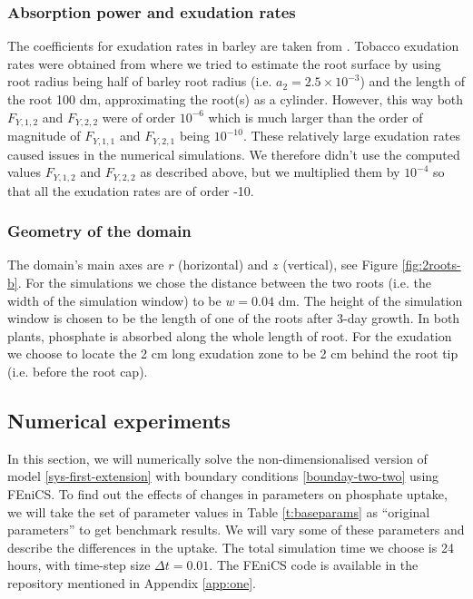 \documentclass[11pt]{article}
\numberwithin{equation}{section}
\begin{document}
\subsubsection{Absorption power and exudation rates}
The coefficients for exudation rates in barley are taken from \cite{Ruiz-2020}. Tobacco exudation rates were obtained from \cite{giles_george} where we tried to estimate the root surface by using root radius being half of barley root radius (i.e. $a_2 = 2.5 \times 10^{-3}$) and the length of the root 100 \si{dm}, approximating the root(s) as a cylinder. However, this way both $F_{Y,1,2}$ and $F_{Y,2,2}$ were of order $10^{-6}$ which is much larger than the order of magnitude of $F_{Y,1,1}$ and $F_{Y,2,1}$ being $10^{-10}$. These relatively large exudation rates caused issues in the numerical simulations. We therefore didn't use the computed values $F_{Y,1,2}$ and $F_{Y,2,2}$ as described above, but we multiplied them by $10^{-4}$ so that all the exudation rates are of order -10.

\subsubsection{Geometry of the domain}
The domain's main axes are $r$ (horizontal) and $z$ (vertical), see Figure \ref{fig:2roots-b}. For the simulations we chose the distance between the two roots (i.e. the width of the simulation window) to be $w = 0.04$ \si{dm}. The height of the simulation window is chosen to be the length of one of the roots after 3-day growth. In both plants, phosphate is absorbed along the whole length of root. For the exudation we choose to locate the 2 \si{cm} long exudation zone to be 2 \si{cm} behind the root tip (i.e. before the root cap).

\subsection{Numerical experiments}
In this section, we will numerically solve the non-dimensionalised version of model \eqref{sys-first-extension} with boundary conditions \eqref{bounday-two-two} using FEniCS. To find out the effects of changes in parameters on phosphate uptake, we will take the set of parameter values in Table \ref{t:baseparams} as ``original parameters'' to get benchmark results. We will vary some of these parameters and describe the differences in the uptake. The total simulation time we choose is 24 hours, with time-step size $\Delta t = 0.01$. The FEniCS code is available in the repository mentioned in Appendix \ref{app:one}.
\end{document}
